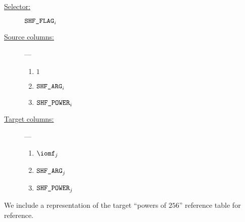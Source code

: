 \begin{description}
	\item[\underline{Selector:}] $\texttt{SHF\_FLAG} _{i}$
	\item[\underline{Source columns:}] ---
		\begin{multicols}{3}
			\begin{enumerate}
				\item $1$
				\item $\texttt{SHF\_ARG}   _{i}$
				\item $\texttt{SHF\_POWER} _{i}$
			\end{enumerate}
		\end{multicols}
	\item[\underline{Target columns:}] ---
		\begin{multicols}{3}
			\begin{enumerate}
				\item $\iomf     _{j}$
				\item $\texttt{SHF\_ARG}   _{j}$
				\item $\texttt{SHF\_POWER} _{j}$
			\end{enumerate}
		\end{multicols}
\end{description}
\saNote{}
We include a representation of the target ``powers of $256$'' reference table for reference.


